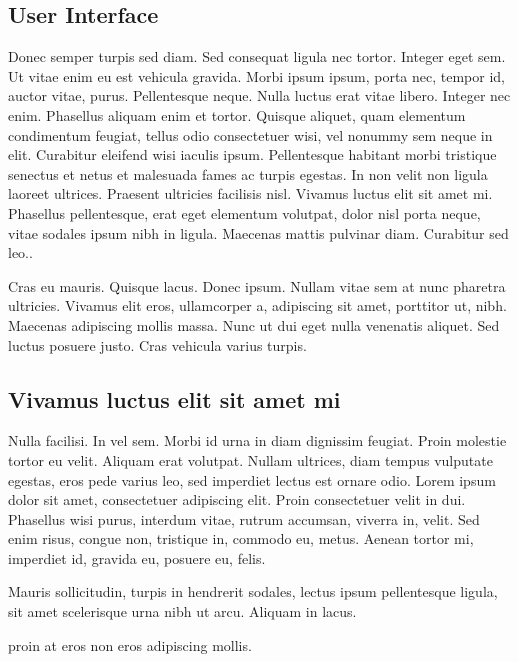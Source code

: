 \subsection{User Interface}
Donec semper turpis sed diam. Sed consequat ligula nec tortor. Integer eget sem. Ut vitae enim eu est vehicula gravida. Morbi ipsum ipsum, porta nec, tempor id, auctor vitae, purus. Pellentesque neque. Nulla luctus erat vitae libero. Integer nec enim. Phasellus aliquam enim et tortor. Quisque aliquet, quam elementum condimentum feugiat, tellus odio consectetuer wisi, vel nonummy sem neque in elit. Curabitur eleifend wisi iaculis ipsum. Pellentesque habitant morbi tristique senectus et netus et malesuada fames ac turpis egestas. In non velit non ligula laoreet ultrices. Praesent ultricies facilisis nisl. Vivamus luctus elit sit amet mi. Phasellus pellentesque, erat eget elementum volutpat, dolor nisl porta neque, vitae sodales ipsum nibh in ligula. Maecenas mattis pulvinar diam. Curabitur sed leo..

Cras eu mauris. Quisque lacus. Donec ipsum. Nullam vitae sem at nunc pharetra ultricies. Vivamus elit eros, ullamcorper a, adipiscing sit amet, porttitor ut, nibh. Maecenas adipiscing mollis massa. Nunc ut dui eget nulla venenatis aliquet. Sed luctus posuere justo. Cras vehicula varius turpis. 
\subsection{Vivamus luctus elit sit amet mi}
Nulla facilisi. In vel sem. Morbi id urna in diam dignissim feugiat. Proin molestie tortor eu velit. Aliquam erat volutpat. Nullam ultrices, diam tempus vulputate egestas, eros pede varius leo, sed imperdiet lectus est ornare odio. Lorem ipsum dolor sit amet, consectetuer adipiscing elit. Proin consectetuer velit in dui. Phasellus wisi purus, interdum vitae, rutrum accumsan, viverra in, velit. Sed enim risus, congue non, tristique in, commodo eu, metus. Aenean tortor mi, imperdiet id, gravida eu, posuere eu, felis. 

Mauris sollicitudin, turpis in hendrerit sodales, lectus ipsum pellentesque ligula, sit amet scelerisque urna nibh ut arcu. Aliquam in lacus. 

 proin at eros non eros adipiscing mollis.

